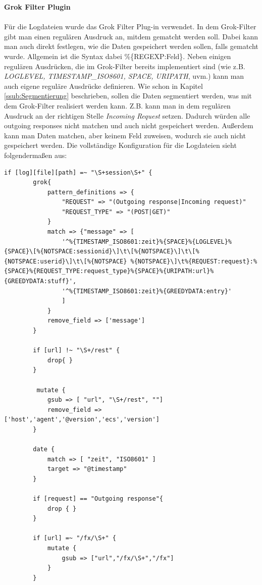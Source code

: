 \textbf{Grok Filter Plugin}\\
\\
Für die Logdateien wurde das Grok Filter Plug-in verwendet. In dem Grok-Filter gibt man einen regulären Ausdruck an, mitdem gematcht werden soll. Dabei kann man auch direkt festlegen, wie die Daten gespeichert werden sollen, falls gematcht wurde. Allgemein ist die Syntax dabei \%\{REGEXP:Feld\}. Neben einigen regulären Ausdrücken, die im Grok-Filter bereits implementiert sind (wie z.B. \textit{LOGLEVEL, TIMESTAMP\_ISO8601, SPACE, URIPATH}, uvm.) kann man auch eigene reguläre Ausdrücke definieren.
Wie schon in Kapitel \ref{ssub:Segmentierung} beschrieben, sollen die Daten segmentiert werden, was mit dem Grok-Filter realisiert werden kann. Z.B. kann man in dem regulären Ausdruck an der richtigen Stelle \textit{Incoming Request} setzen. Dadurch würden alle outgoing responses nicht matchen und auch nicht gespeichert werden. Außerdem kann man Daten matchen, aber keinem Feld zuweisen, wodurch sie auch nicht gespeichert werden. 
Die vollständige Konfiguration für die Logdateien sieht folgendermaßen aus:\\
\newpage
\begin{lstlisting}[caption = Sessionlog Filter,captionpos=b]
if [log][file][path] =~ "\S+session\S+" {
        grok{
            pattern_definitions => {
                "REQUEST" => "(Outgoing response|Incoming request)"
                "REQUEST_TYPE" => "(POST|GET)"
            }
            match => {"message" => [
                '^%{TIMESTAMP_ISO8601:zeit}%{SPACE}%{LOGLEVEL}%{SPACE}\[%{NOTSPACE:sessionid}\]\t\[%{NOTSPACE}\]\t\[%{NOTSPACE:userid}\]\t\[%{NOTSPACE} %{NOTSPACE}\]\t%{REQUEST:request}:%{SPACE}%{REQUEST_TYPE:request_type}%{SPACE}%{URIPATH:url}%{GREEDYDATA:stuff}',
                '^%{TIMESTAMP_ISO8601:zeit}%{GREEDYDATA:entry}'
                ]
            }
            remove_field => ['message']
        }

        if [url] !~ "\S+/rest" {
            drop{ }
        }

         mutate {
            gsub => [ "url", "\S+/rest", ""]
            remove_field => ['host','agent','@version','ecs','version']
        }

        date {
            match => [ "zeit", "ISO8601" ]
            target => "@timestamp"
		}

        if [request] == "Outgoing response"{
            drop { }
        }

        if [url] =~ "/fx/\S+" {
            mutate {
                gsub => ["url","/fx/\S+","/fx"]
            }
        }
\end{lstlisting}
\newpage
\label{lst:logEntryFilter}

